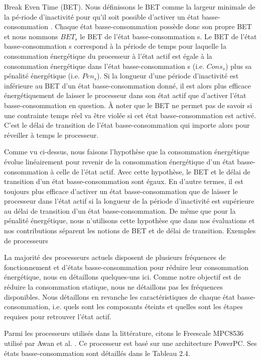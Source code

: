 Break Even Time (BET). Nous définissons le BET comme la largeur minimale de la pé-riode d’inactivité pour qu’il soit possible d’activer un état basse-consommation \cite{AP11, CG06, DA08a}.
 Chaque état basse-consommation possède donc son propre BET et nous nommons $BET_s$ le BET de l’état basse-consommation s. 
 Le BET de l’état basse-consommation s correspond à la période de temps pour laquelle la consommation énergétique du processeur à l’état actif est égale à la consommation énergétique
 dans l’état basse-consommation s (i.e. $Cons_s$) plus sa pénalité énergétique (i.e. $Pen_s$). Si la longueur d’une période d’inactivité est inférieure au BET d’un état basse-consommation
 donné, il est alors plus eﬃcace énergétiquement de laisser le processeur dans son état actif que d’activer l’état basse-consommation en question. À noter que le BET ne permet pas de savoir 
 si une contrainte temps réel va être violée si cet état basse-consommation est activé. C’est le délai de transition de l’état basse-consommation qui importe alors pour réveiller à temps le processeur.

Comme vu ci-dessus, nous faisons l’hypothèse que la consommation énergétique évolue linéairement pour revenir de la consommation énergétique d’un état basse-consommation à celle de l’état actif. 
Avec cette hypothèse, le BET et le délai de transition d’un état basse-consommation sont égaux. 
En d’autre termes, il est toujours plus eﬃcace d’activer un état basse-consommation que de laisser le processeur dans l’état actif si la longueur de la période d’inactivité 
est supérieure au délai de transition d’un état basse-consommation. De même que pour la pénalité énergétique, nous n’utilisons cette hypothèse que dans nos évaluations et 
nos contributions séparent les notions de BET et de délai de transition.
Exemples de processeurs

La majorité des processeurs actuels disposent de plusieurs fréquences de fonctionnement et d’états basse-consommation pour réduire leur consommation énergétique, nous en détaillons quelques-uns ici. Comme notre objectif est de réduire la consommation statique, nous ne détaillons pas les fréquences disponibles. Nous détaillons en revanche les caractéristiques de chaque état basse-consommation, i.e. quels sont les composants éteints et quelles sont les étapes requises pour retrouver l’état actif.

Parmi les processeurs utilisés dans la littérature, citons le Freescale MPC8536 \cite{MPC} utilisé par Awan et al. \cite{AP11, AP13, AYP13}. Ce processeur est basé sur une architecture PowerPC. Ses états basse-consommation sont détaillés dans le Tableau 2.4.
